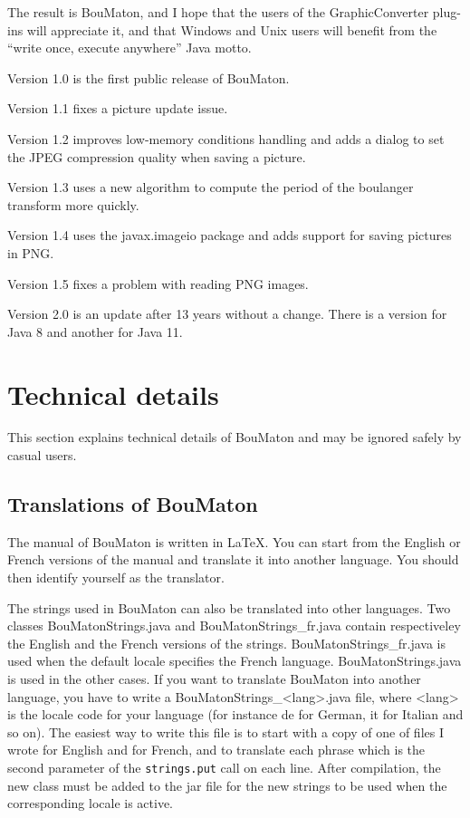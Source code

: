 \documentclass[a4paper]{article}
\newcommand{\BouMaton}{\textsf{BouMaton}\xspace}
\newcommand{\filename}[1]{\textsf{#1}}
\begin{document}
  The result is \BouMaton, and I hope that the users of the 
  GraphicConverter plug-ins will appreciate it, and that Windows and 
  Unix users will benefit from the ``write once, execute anywhere'' 
  Java motto.
  
  \medskip
  
  \noindent Version 1.0 is the first public release of \BouMaton.
  \par\smallskip
  \noindent Version 1.1 fixes a picture update issue.
  \par\smallskip
  \noindent Version 1.2 improves low-memory conditions handling and
  adds a dialog to set the JPEG compression quality when saving a picture.
  \par\smallskip
  \noindent Version 1.3 uses a new algorithm to compute the period of 
  the boulanger transform more quickly.
  \par\smallskip
  \noindent Version 1.4 uses the javax.imageio package and adds
  support for saving pictures in PNG.
  \par\smallskip
  \noindent Version 1.5 fixes a problem with reading PNG images.
  \par\smallskip
  \noindent Version 2.0 is an update after 13 years without a change. 
  There is a version for Java 8 and another for Java 11.
  
  \section{Technical details\label{sec:tech-details}}
  This section explains technical details of \BouMaton and may be 
  ignored safely by casual users.
  
  \subsection{Translations of \BouMaton}
  The manual of \BouMaton is written in \LaTeX. You can start from the 
  English or French versions of the manual and translate it into another 
  language. You should then identify yourself as the translator.
  
  The strings used in \BouMaton can also be translated into other 
  languages. Two classes
  \filename{BouMatonStrings.java} and \filename{BouMatonStrings\_fr.java} 
  contain respectiveley the English and the French versions of the strings.
  \filename{BouMatonStrings\_fr.java} is used when the default locale specifies 
  the French language. \filename{BouMatonStrings.java} is used in the other cases.
  If you want to translate \BouMaton into another language, you have 
  to write a \filename{BouMatonStrings\_<lang>.java} file, where 
  \filename{<lang>} is the locale code for your language (for instance 
  \filename{de} for German, \filename{it} for Italian and so on). The 
  easiest way to write this file is to start with a copy of one of 
  files I wrote for English and for French, and to translate each 
  phrase which is the second parameter of the \texttt{strings.put} call on each line.
  After compilation, the new class must be added to the jar file for the new strings 
  to be used when the corresponding locale is active.
  
\end{document}
